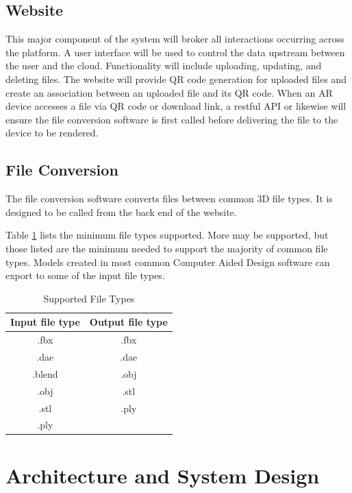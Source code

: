 \subsection{Website}
This major component of the system will broker all interactions occurring across the platform. A user interface will be used to control the data upstream between the user and the cloud. Functionality will include uploading, updating, and deleting files. The website will provide QR code generation for uploaded files and create an association between an uploaded file and its QR code. When an AR device accesses a file via QR code or download link, a restful API or likewise will ensure the file conversion software is first called before delivering the file to the device to be rendered.  


\subsection{File Conversion}
The file conversion software converts files between common 3D file types. It is designed to be called from the back end of the website.

Table \ref{tab:suportedfiletypes} lists the minimum file types supported.  More may be supported, but those listed are the minimum needed to support the majority of common file types.  
Models created in most common Computer Aided Design software can export to some of the input file types.

\begin{table}[!h]
    \centering
    \begin{tabular}{| c | c |}
        \hline
        Input file type & Output file type \\
        \hline
        .fbx & .fbx \\
        .dae & .dae \\
        .blend & .obj \\ 
        .obj & .stl \\
        .stl & .ply \\
        .ply & \\
        \hline
    \end{tabular}
    \caption{Supported File Types}
    \label{tab:suportedfiletypes}
\end{table}

 \section{Architecture and System Design}
 
